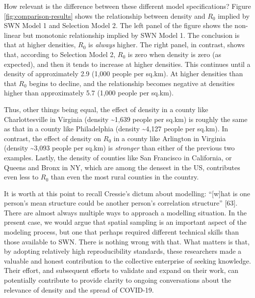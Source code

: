 \documentclass[10pt,letterpaper]{article}
\begin{document}
How relevant is the difference between these different model
specifications? Figure \ref{fig:comparison-results} shows the
relationship between density and \(R_0\) implied by SWN Model 1 and
Selection Model 2. The left panel of the figure shows the non-linear but
monotonic relationship implied by SWN Model 1. The conclusion is that at
higher densities, \(R_0\) is \emph{always} higher. The right panel, in
contrast, shows that, according to Selection Model 2, \(R_0\) is zero
when density is zero (as expected), and then it tends to increase at
higher densities. This continues until a density of approximately 2.9
(1,000 people per sq.km). At higher densities than that \(R_0\) begins
to decline, and the relationship becomes negative at densities higher
than approximately 5.7 (1,000 people per sq.km).

Thus, other things being equal, the effect of density in a county like
Charlottesville in Virginia (density \textasciitilde1,639 people per
sq.km) is roughly the same as that in a county like Philadelphia
(density \textasciitilde4,127 people per sq.km). In contrast, the effect
of density on \(R_0\) in a county like Arlington in Virginia (density
\textasciitilde3,093 people per sq.km) is \emph{stronger} than either of
the previous two examples. Lastly, the density of counties like San
Francisco in California, or Queens and Bronx in NY, which are among the
densest in the US, contributes even less to \(R_0\) than even the most
rural counties in the country.

It is worth at this point to recall Cressie's dictum about modelling:
``{[}w{]}hat is one person's mean structure could be another person's
correlation structure'' {[}63{]}. There are almost always multiple ways
to approach a modelling situation. In the present case, we would argue
that spatial sampling is an important aspect of the modeling process,
but one that perhaps required different technical skills than those
available to SWN. There is nothing wrong with that. What matters is
that, by adopting relatively high reproducibility standards, these
researchers made a valuable and honest contribution to the collective
enterprise of seeking knowledge. Their effort, and subsequent efforts to
validate and expand on their work, can potentially contribute to provide
clarity to ongoing conversations about the relevance of density and the
spread of COVID-19.
\end{document}
